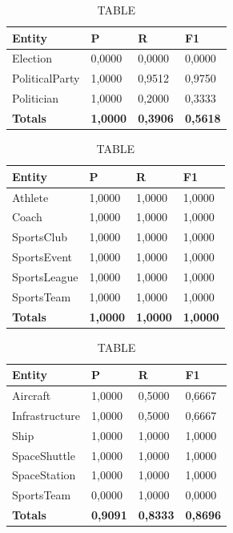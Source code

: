 \documentclass[thesis=M,english]{FITthesis}[2018/05/30]
\begin{document}
	\begin{table}[H]\centering
		\caption{TABLE}
		\label{}
		\begin{tabular}{|l|l|l|l|}
			\hline {\textbf{Entity}} & {\textbf{P}} & {\textbf{R}} & {\textbf{F1}}\\\hline
				Election & 0,0000 & 0,0000 & 0,0000\\
				PoliticalParty & 1,0000 & 0,9512 & 0,9750\\
				Politician & 1,0000 & 0,2000 & 0,3333\\\hline
				\textbf{Totals} & \textbf{1,0000} & \textbf{0,3906} & \textbf{0,5618}\\\hline
		\end{tabular}
	\end{table}	

	\begin{table}[H]\centering
		\caption{TABLE}
		\label{}
		\begin{tabular}{|l|l|l|l|}
			\hline {\textbf{Entity}} & {\textbf{P}} & {\textbf{R}} & {\textbf{F1}}\\\hline
				Athlete & 1,0000 & 1,0000 & 1,0000\\
				Coach & 1,0000 & 1,0000 & 1,0000\\
				SportsClub & 1,0000 & 1,0000 & 1,0000\\
				SportsEvent & 1,0000 & 1,0000 & 1,0000\\
				SportsLeague & 1,0000 & 1,0000 & 1,0000\\
				SportsTeam & 1,0000 & 1,0000 & 1,0000\\\hline
				\textbf{Totals} & \textbf{1,0000} & \textbf{1,0000} & \textbf{1,0000}\\\hline
		\end{tabular}
	\end{table}	

	\begin{table}[H]\centering
		\caption{TABLE}
		\label{}
		\begin{tabular}{|l|l|l|l|}
			\hline {\textbf{Entity}} & {\textbf{P}} & {\textbf{R}} & {\textbf{F1}}\\\hline
				Aircraft & 1,0000 & 0,5000 & 0,6667\\
				Infrastructure & 1,0000 & 0,5000 & 0,6667\\
				Ship & 1,0000 & 1,0000 & 1,0000\\				
				SpaceShuttle & 1,0000 & 1,0000 & 1,0000\\
				SpaceStation & 1,0000 & 1,0000 & 1,0000\\
				SportsTeam & 0,0000 & 1,0000 & 0,0000\\\hline
				\textbf{Totals} & \textbf{0,9091} & \textbf{0,8333} & \textbf{0,8696}\\\hline
		\end{tabular}
	\end{table}
\end{document}
